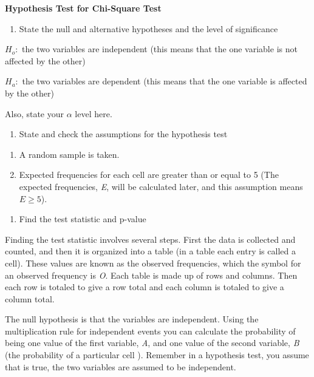 \documentclass[
]{book}
\providecommand{\tightlist}{%
  \setlength{\itemsep}{0pt}\setlength{\parskip}{0pt}}
\begin{document}
\textbf{Hypothesis Test for Chi-Square Test}

\begin{enumerate}
\def\labelenumi{\arabic{enumi}.}
\tightlist
\item
  State the null and alternative hypotheses and the level of significance
\end{enumerate}

\(H_o:\) the two variables are independent (this means that the one variable is not affected by the other)

\(H_a:\) the two variables are dependent (this means that the one variable is affected by the other)

Also, state your \(\alpha\) level here.

\begin{enumerate}
\def\labelenumi{\arabic{enumi}.}
\setcounter{enumi}{1}
\tightlist
\item
  State and check the assumptions for the hypothesis test
\end{enumerate}

\begin{enumerate}
\def\labelenumi{\alph{enumi}.}
\item
  A random sample is taken.
\item
  Expected frequencies for each cell are greater than or equal to 5 (The expected frequencies, \emph{E}, will be calculated later, and this assumption means \(E\ge5\)).
\end{enumerate}

\begin{enumerate}
\def\labelenumi{\arabic{enumi}.}
\setcounter{enumi}{2}
\tightlist
\item
  Find the test statistic and p-value
\end{enumerate}

Finding the test statistic involves several steps. First the data is collected and counted, and then it is organized into a table (in a table each entry is called a cell). These values are known as the observed frequencies, which the symbol for an observed frequency is \emph{O}. Each table is made up of rows and columns. Then each row is totaled to give a row total and each column is totaled to give a column total.

The null hypothesis is that the variables are independent. Using the multiplication rule for independent events you can calculate the probability of being one value of the first variable, \emph{A}, and one value of the second variable, \emph{B} (the probability of a particular cell ). Remember in a hypothesis test, you assume that is true, the two variables are assumed to be independent.
\end{document}

